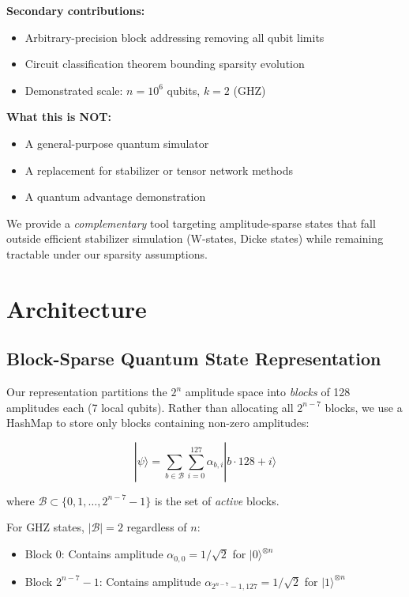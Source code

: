 \documentclass[11pt,twocolumn]{article}
\begin{document}
\textbf{Secondary contributions:}
\begin{itemize}
    \item Arbitrary-precision block addressing removing all qubit limits
    \item Circuit classification theorem bounding sparsity evolution
    \item Demonstrated scale: $n = 10^6$ qubits, $k = 2$ (GHZ)
\end{itemize}

\textbf{What this is NOT:}
\begin{itemize}
    \item A general-purpose quantum simulator
    \item A replacement for stabilizer or tensor network methods
    \item A quantum advantage demonstration
\end{itemize}

We provide a \emph{complementary} tool targeting amplitude-sparse states that fall outside efficient stabilizer simulation (W-states, Dicke states) while remaining tractable under our sparsity assumptions.

\section{Architecture}

\subsection{Block-Sparse Quantum State Representation}

Our representation partitions the $2^n$ amplitude space into \emph{blocks} of 128 amplitudes each (7 local qubits). Rather than allocating all $2^{n-7}$ blocks, we use a HashMap to store only blocks containing non-zero amplitudes:

\begin{equation}
    |\psi\rangle = \sum_{b \in \mathcal{B}} \sum_{i=0}^{127} \alpha_{b,i} |b \cdot 128 + i\rangle
\end{equation}

where $\mathcal{B} \subset \{0, 1, \ldots, 2^{n-7}-1\}$ is the set of \emph{active} blocks.

For GHZ states, $|\mathcal{B}| = 2$ regardless of $n$:
\begin{itemize}
    \item Block 0: Contains amplitude $\alpha_{0,0} = 1/\sqrt{2}$ for $|0\rangle^{\otimes n}$
    \item Block $2^{n-7}-1$: Contains amplitude $\alpha_{2^{n-7}-1, 127} = 1/\sqrt{2}$ for $|1\rangle^{\otimes n}$
\end{itemize}
\end{document}
